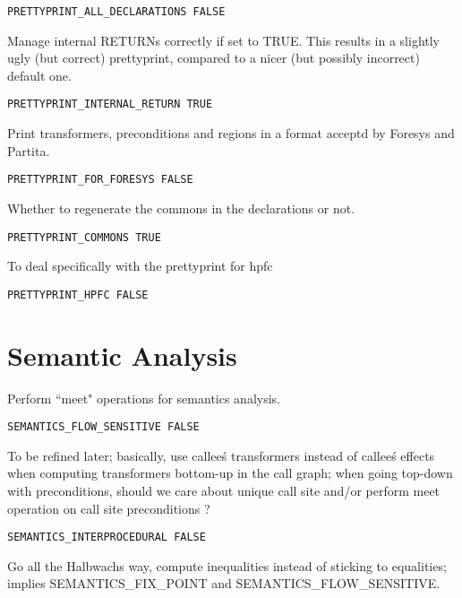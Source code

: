 \begin{verbatim}
PRETTYPRINT_ALL_DECLARATIONS FALSE
\end{verbatim}

Manage internal RETURNs correctly if set to TRUE.  This results in a
slightly ugly (but correct) prettyprint, compared to a nicer (but
possibly incorrect) default one.

\begin{verbatim}
PRETTYPRINT_INTERNAL_RETURN TRUE
\end{verbatim}

Print transformers, preconditions and regions in a format acceptd by Foresys and
Partita. 

\begin{verbatim}
PRETTYPRINT_FOR_FORESYS FALSE
\end{verbatim}

Whether to regenerate the commons in the declarations or not.

\begin{verbatim}
PRETTYPRINT_COMMONS TRUE
\end{verbatim}

To deal specifically with the prettyprint for hpfc

\begin{verbatim}
PRETTYPRINT_HPFC FALSE
\end{verbatim}

\section{Semantic Analysis}

Perform ``meet" operations for semantics analysis.

\begin{verbatim}
SEMANTICS_FLOW_SENSITIVE FALSE
\end{verbatim}

To be refined later; basically, use callee\'s transformers instead of
callee\'s effects when computing transformers bottom-up in the call graph;
when going top-down with preconditions, should we care about unique
call site and/or perform meet operation on call site preconditions ?

\begin{verbatim}
SEMANTICS_INTERPROCEDURAL FALSE
\end{verbatim}

Go all the Halbwachs way, compute inequalities instead of sticking
to equalities; implies SEMANTICS\_FIX\_POINT and SEMANTICS\_FLOW\_SENSITIVE.

